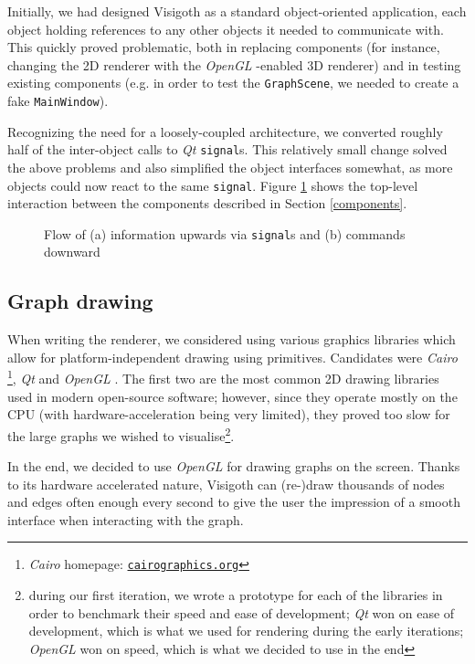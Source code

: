 \documentclass[a4paper,11pt,titlepage]{article}
\let\stdhref\href
\renewcommand{\href}[2]{\stdhref{#1}{\texttt{#2}}}
\newcommand{\code}[1]{\texttt{#1}}
\newcommand{\buzz}[1]{\emph{#1}}
\newcommand{\Qt}{\buzz{Qt} }
\newcommand{\OpenGL}{\buzz{OpenGL} }
\newcommand{\Cairo}{\buzz{Cairo} }
\begin{document}
Initially, we had designed Visigoth as a standard object-oriented
application, each object holding references to any other objects it
needed to communicate with. This quickly proved problematic, both in
replacing components (for instance, changing the 2D renderer with the
\OpenGL-enabled 3D renderer) and in testing existing components
(e.g. in order to test the \code{GraphScene}, we needed to create a
fake \code{MainWindow}).

Recognizing the need for a loosely-coupled architecture, we converted
roughly half of the inter-object calls to \Qt \code{signal}s. This
relatively small change solved the above problems and also simplified
the object interfaces somewhat, as more objects could now react to the
same \code{signal}. Figure \ref{fig:interaction} shows the top-level
interaction between the components described in Section
\ref{components}.

\begin{figure}[ht!]
  \centering
  
  \caption{Flow of (a) information upwards via \code{signal}s and (b)
    commands downward}
  \label{fig:interaction}
\end{figure}

\subsection{Graph drawing}

When writing the renderer, we considered using various graphics
libraries which allow for platform-independent drawing using
primitives. Candidates were \Cairo\footnote{\Cairo homepage:
  \href{http://cairographics.org/}{cairographics.org}}, \Qt and
\OpenGL. The first two are the most common 2D drawing libraries used
in modern open-source software; however, since they operate mostly on
the CPU (with hardware-acceleration being very limited), they proved
too slow for the large graphs we wished to visualise\footnote{during
  our first iteration, we wrote a prototype for each of the libraries
  in order to benchmark their speed and ease of development; \Qt won
  on ease of development, which is what we used for rendering during
  the early iterations; \OpenGL won on speed, which is what we decided
  to use in the end}.

In the end, we decided to use \OpenGL for drawing graphs on the
screen. Thanks to its hardware accelerated nature, Visigoth can
(re-)draw thousands of nodes and edges often enough every second to
give the user the impression of a smooth interface when interacting
with the graph.
\end{document}
